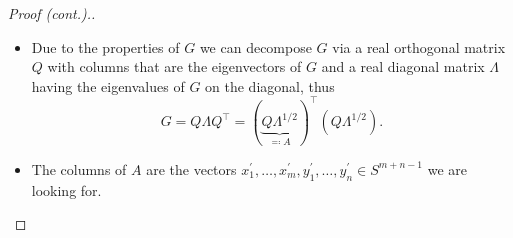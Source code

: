 	\begin{frame}
		\begin{proof}[Proof (cont.).]
			\begin{itemize}
				\item<1-> Due to the properties of $G$ we can decompose $G$ via a real orthogonal matrix $Q$ with columns that are the eigenvectors of $G$ and a real diagonal matrix $\Lambda$ having the eigenvalues of $G$ on the diagonal, thus
					\begin{equation}
						G=Q\Lambda Q^\top =(\underbrace{Q\Lambda^{1/2}}_{\eqqcolon A})^\top(Q\Lambda^{1/2}).
					\end{equation}
				\item<2-> The columns of $A$ are the vectors $x_1^\prime,\dots,x_m^\prime,y_1^\prime,\dots,y_n^\prime \in S^{m+n-1}$ we are looking for.
			\end{itemize}
		\end{proof}
	\end{frame}
	

